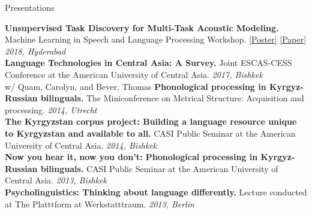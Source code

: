 \documentclass{resume} %
\begin{document}
\vspace{.25cm}

\begin{rSection}{Presentations}

  {\bf Unsupervised Task Discovery for Multi-Task Acoustic Modeling.} {Machine Learning in Speech and Language Processing Workshop.} {\href{https://github.com/JRMeyer/mlslp/blob/master/poster/mlslp-poster.pdf}{[Poster]}} {\href{https://sites.google.com/view/mlslp/proceedings}{[Paper]}}  \hfill {\em 2018, Hyderabad} \\  
  
  {\bf Language Technologies in Central Asia: A Survey.} {Joint ESCAS-CESS Conference at the American University of Central Asia.} \hfill {\em 2017, Bishkek} \\
  

{w/ Quam, Carolyn, and Bever, Thomas} {\bf Phonological processing in Kyrgyz-Russian bilinguals.} {The Miniconference on Metrical Structure: Acquisition and processing.} \hfill {\em 2014, Utrecht} \\

{\bf The Kyrgyzstan corpus project: Building a language resource unique to Kyrgyzstan and available to all.} {CASI Public Seminar at the American University of Central Asia.} \hfill {\em 2014, Bishkek} \\

{\bf Now you hear it, now you don’t: Phonological processing in Kyrgyz-Russian bilinguals.} {CASI Public Seminar at the American University of Central Asia.} \hfill {\em 2013, Bishkek} \\

{\bf Psycholinguistics: Thinking about language differently.} {Lecture conducted at The Platttform at Werkstatttraum.} \hfill {\em 2013, Berlin} \\


\end{rSection}

\end{document}
